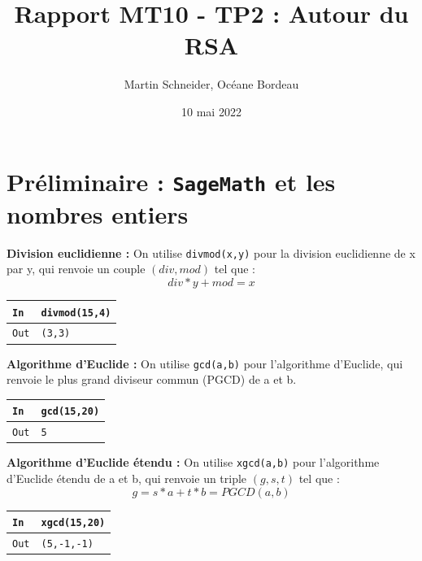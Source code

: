 \documentclass[titlepage]{article}
\title{Rapport MT10 - TP2 : Autour du RSA}
\author{Martin Schneider, Océane Bordeau}
\date{10 mai 2022}
\begin{document}
    \maketitle
    \tableofcontents
    \pagebreak

    \section{Préliminaire : \texttt{SageMath} et les nombres entiers}
    \textbf{Division euclidienne :}
    On utilise \texttt{divmod(x,y)} pour la division euclidienne de x par y, qui renvoie un couple $(div, mod)$ tel que :
    \[div*y + mod = x\]

    \begin{tabularx}{12cm}{|p{0.60cm}|X|}
        \hline
        \rowcolor{gray}
        \texttt{In}
        & 
        \texttt{divmod(15,4)}
        \\
        \hline
        \texttt{Out}
        &
        \texttt{(3,3)}
        \\
        \hline
    \end{tabularx}
    \bigbreak\bigbreak

    \textbf{Algorithme d'Euclide :}
    On utilise \texttt{gcd(a,b)} pour l'algorithme d'Euclide, qui renvoie le plus grand diviseur commun (PGCD) de a et b. \bigbreak

    \begin{tabularx}{12cm}{|p{0.60cm}|X|}
        \hline
        \rowcolor{gray}
        \texttt{In}
        & 
        \texttt{gcd(15,20)}
        \\
        \hline
        \texttt{Out}
        &
        \texttt{5}
        \\
        \hline
    \end{tabularx}
    \bigbreak\bigbreak

    \textbf{Algorithme d'Euclide étendu :}
    On utilise \texttt{xgcd(a,b)} pour l'algorithme d'Euclide étendu de a et b, qui renvoie un triple $(g, s, t)$ tel que :
    \[g = s*a + t*b = PGCD(a,b)\]

    \begin{tabularx}{12cm}{|p{0.60cm}|X|}
        \hline
        \rowcolor{gray}
        \texttt{In}
        & 
        \texttt{xgcd(15,20)}
        \\
        \hline
        \texttt{Out}
        &
        \texttt{(5,-1,-1)}
        \\
        \hline
    \end{tabularx}
    \bigbreak\bigbreak
\end{document}
